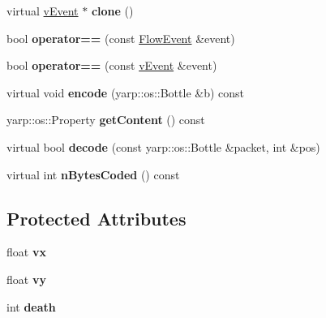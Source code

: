 \begin{DoxyCompactItemize}
\item 
\hypertarget{classemorph_1_1FlowEvent_abd75e287bbb7706e003fe9c04eaefad7}{virtual \hyperlink{classemorph_1_1vEvent}{v\-Event} $\ast$ {\bfseries clone} ()}\label{classemorph_1_1FlowEvent_abd75e287bbb7706e003fe9c04eaefad7}

\item 
\hypertarget{classemorph_1_1FlowEvent_ab4a83c61991e5524563b3d01f9bc96c5}{bool {\bfseries operator==} (const \hyperlink{classemorph_1_1FlowEvent}{Flow\-Event} \&event)}\label{classemorph_1_1FlowEvent_ab4a83c61991e5524563b3d01f9bc96c5}

\item 
\hypertarget{classemorph_1_1FlowEvent_a16f5cf617614d24c79682179e9e79a58}{bool {\bfseries operator==} (const \hyperlink{classemorph_1_1vEvent}{v\-Event} \&event)}\label{classemorph_1_1FlowEvent_a16f5cf617614d24c79682179e9e79a58}

\item 
\hypertarget{classemorph_1_1FlowEvent_aa7006b5c0b0b94323c7d35244ba060e1}{virtual void {\bfseries encode} (yarp\-::os\-::\-Bottle \&b) const }\label{classemorph_1_1FlowEvent_aa7006b5c0b0b94323c7d35244ba060e1}

\item 
\hypertarget{classemorph_1_1FlowEvent_a77ba93883a630f0a3cb84821df184d1b}{yarp\-::os\-::\-Property {\bfseries get\-Content} () const }\label{classemorph_1_1FlowEvent_a77ba93883a630f0a3cb84821df184d1b}

\item 
\hypertarget{classemorph_1_1FlowEvent_ad416511478fe847398540a483355d863}{virtual bool {\bfseries decode} (const yarp\-::os\-::\-Bottle \&packet, int \&pos)}\label{classemorph_1_1FlowEvent_ad416511478fe847398540a483355d863}

\item 
\hypertarget{classemorph_1_1FlowEvent_ae0fd9eb8662a0db29d3b202073c7c4ea}{virtual int {\bfseries n\-Bytes\-Coded} () const }\label{classemorph_1_1FlowEvent_ae0fd9eb8662a0db29d3b202073c7c4ea}

\end{DoxyCompactItemize}
\subsection*{Protected Attributes}
\begin{DoxyCompactItemize}
\item 
\hypertarget{classemorph_1_1FlowEvent_aa4d42211253a4bce0338abac18942cf4}{float {\bfseries vx}}\label{classemorph_1_1FlowEvent_aa4d42211253a4bce0338abac18942cf4}

\item 
\hypertarget{classemorph_1_1FlowEvent_aad6c4691417beaeff3c64800adc236a3}{float {\bfseries vy}}\label{classemorph_1_1FlowEvent_aad6c4691417beaeff3c64800adc236a3}

\item 
\hypertarget{classemorph_1_1FlowEvent_a772a1742ab4e71afa6bb7fb93c6b6776}{int {\bfseries death}}\label{classemorph_1_1FlowEvent_a772a1742ab4e71afa6bb7fb93c6b6776}

\end{DoxyCompactItemize}
